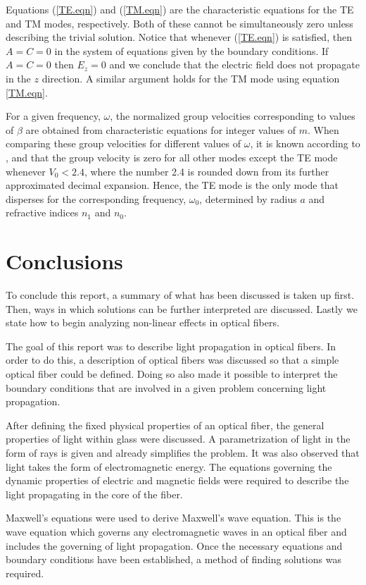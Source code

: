 \documentclass[12pt]{article}
\theoremstyle{definition}
\numberwithin{equation}{section}
\begin{document}
{Equations (\ref{TE.eqn}) and (\ref{TM.eqn}) are the characteristic equations for the TE and TM modes, respectively. Both of these cannot be simultaneously zero unless describing the trivial solution. Notice that whenever (\ref{TE.eqn}) is satisfied, then $A=C=0$ in the system of equations given by the boundary conditions. If $A=C=0$ then $E_z=0$ and we conclude that the electric field does not propagate in the $z$ direction. A similar argument holds for the TM mode using equation \ref{TM.eqn}.

For a given frequency, $\omega$, the normalized group velocities corresponding to values of $\beta$ are obtained from characteristic equations for integer values of $m$. When comparing these group velocities for different values of $\omega$, it is known according to \cite{Belanger}, \cite{Okamoto} and \cite{Agrawal} that the group velocity is zero for all other modes except the TE mode whenever $V_0<2.4$, where the number 2.4 is rounded down from its further approximated decimal expansion. Hence, the TE mode is the only mode that disperses for the corresponding frequency, $\omega_0$, determined by radius $a$ and refractive indices $n_1$ and $n_0$. 
\section{Conclusions}\label{conclusion.sec}
To conclude this report, a summary of what has been discussed is taken up first. Then, ways in which solutions can be further interpreted are discussed. Lastly we state how to begin analyzing non-linear effects in optical fibers.

The goal of this report was to describe light propagation in optical fibers. In order to do this, a description of optical fibers was discussed so that a simple optical fiber could be defined. Doing so also made it possible to interpret the boundary conditions that are involved in a given problem concerning light propagation.

After defining the fixed physical properties of an optical fiber, the general properties of light within glass were discussed. A parametrization of light in the form of rays is given and already simplifies the problem. It was also observed that light takes the form of electromagnetic energy. The equations governing the dynamic properties of electric and magnetic fields were required to describe the light propagating in the core of the fiber. 

Maxwell's equations were used to derive Maxwell's wave equation.  This is the wave equation which governs any electromagnetic waves in an optical fiber and includes the governing of light propagation. Once the necessary equations and boundary conditions have been established, a method of finding solutions was required.

}
\end{document}
